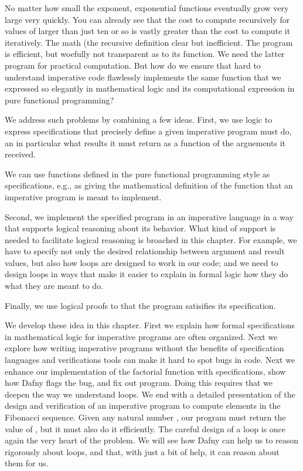 \documentclass[letterpaper,10pt,english]{sphinxmanual}
\begin{document}
No matter how small the exponent, exponential functions eventually
grow very large very quickly. You can already see that the cost to
compute  recursively for values of  larger than just ten or
so is vastly greater than the cost to compute it iteratively. The math
(the recursive definition clear but inefficient. The program is
efficient, but woefully not transparent as to its function. We need
the latter program for practical computation. But how do we ensure
that hard to understand imperative code flawlessly implements the same
function that we expressed so elegantly in mathematical logic and its
computational expression in pure functional programming?

We address such problems by combining a few ideas. First, we use logic
to express  specifications that precisely define  a
given imperative program must do, an in particular what results it
must return as a function of the arguements it received.

We can use functions defined in the pure functional programming style
as specifications, e.g., as giving the mathematical definition of the
 function that an imperative program is meant to implement.

Second, we implement the specified program in an imperative language
in a way that supports logical reasoning about its behavior. What kind
of support is needed to facilitate logical reasoning is broached in
this chapter. For example, we have to specify not only the desired
relationship between argument and result values, but also how loops
are designed to work in our code; and we need to design loops in ways
that make it easier to explain in formal logic how they do what they
are meant to do.

Finally, we use logical proofs to  that the program satisifies
its specification.

We develop these idea in this chapter. First we explain how formal
specifications in mathematical logic for imperative programs are often
organized. Next we explore how writing imperative programs without the
benefits of specification languages and verifications tools can make
it hard to spot bugs in code. Next we enhance our implementation of
the factorial function with specifications, show how Dafny flags the
bug, and fix out program. Doing this requires that we deepen the way
we understand loops. We end with a detailed presentation of the design
and verification of an imperative program to compute elements in the
Fibonacci sequence. Given any natural number , our program must
return the value of , but it must also do it efficiently.  The
careful design of a loop is once again the very heart of the problem.
We will see how Dafny can help us to reason rigorously about loops,
and that, with just a bit of help, it can reason about them for us.
\end{document}
